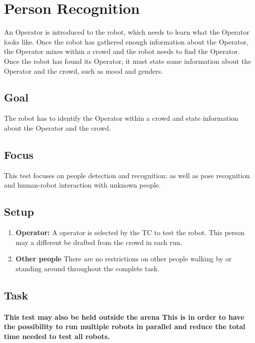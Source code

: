 \section{Person Recognition}

An Operator is introduced to the robot, which needs to learn what the Operator looks like. Once the robot has gathered enough information about the Operator, the Operator mixes within a crowd and the robot needs to find the Operator. Once the robot has found its Operator, it must state some information about the Operator and the crowd, such as mood and genders.

\subsection{Goal}
The robot has to identify the Operator within a crowd and state information about the Operator and the crowd.

\subsection{Focus}

This test focuses on people detection and recognition; as well as pose recognition and human-robot interaction with unknown people.

\subsection{Setup}

\begin{enumerate}
\item \textbf{Operator:} A  operator is selected by the TC to test the robot. 
  This person may a different be drafted from the crowd in each run.
\item \textbf{Other people} There are no restrictions on other people walking by or standing around throughout the complete task.
\end{enumerate}

\subsection{Task}
\paragraph{This test may also be held outside the arena
  This is in order to have the possibility to run multiple robots in parallel and reduce the total time needed to test all robots.}

